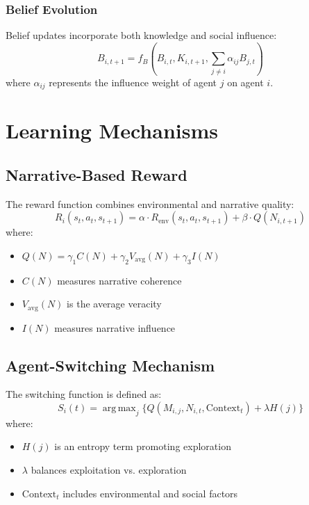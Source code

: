 \documentclass[12pt, a4paper]{article}
\DeclareMathOperator*{\argmax}{arg\,max}
\begin{document}
\subsubsection{Belief Evolution}
Belief updates incorporate both knowledge and social influence:
\begin{equation}
    B_{i,t+1} = f_B(B_{i,t}, K_{i,t+1}, \sum_{j \neq i} \alpha_{ij} B_{j,t})
\end{equation}
where $\alpha_{ij}$ represents the influence weight of agent $j$ on agent $i$.

\section{Learning Mechanisms}

\subsection{Narrative-Based Reward}
The reward function combines environmental and narrative quality:
\begin{equation}
    R_i(s_t, a_t, s_{t+1}) = \alpha \cdot R_{\text{env}}(s_t, a_t, s_{t+1}) + \beta \cdot Q(N_{i,t+1})
\end{equation}
where:
\begin{itemize}
    \item $Q(N) = \gamma_1 C(N) + \gamma_2 V_{\text{avg}}(N) + \gamma_3 I(N)$
    \item $C(N)$ measures narrative coherence
    \item $V_{\text{avg}}(N)$ is the average veracity
    \item $I(N)$ measures narrative influence
\end{itemize}

\subsection{Agent-Switching Mechanism}
The switching function is defined as:
\begin{equation}
    S_i(t) = \argmax_{j} \{Q(M_{i,j}, N_{i,t}, \text{Context}_t) + \lambda H(j)\}
\end{equation}
where:
\begin{itemize}
    \item $H(j)$ is an entropy term promoting exploration
    \item $\lambda$ balances exploitation vs. exploration
    \item $\text{Context}_t$ includes environmental and social factors
\end{itemize}
\end{document}
